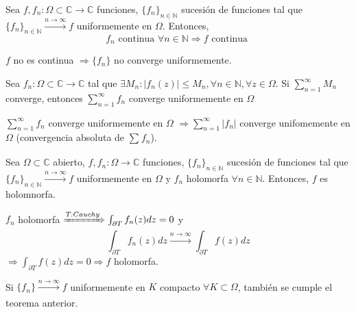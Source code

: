 \begin{prop}
  Sea $f,f_{n}: \Omega \subset \mathbb{C} \to \mathbb{C}$ funciones, $\{ f_{n} \}_{n \in \mathbb{N}}$ sucesión de funciones tal que $\{ f_{n} \}_{n \in \mathbb{N}} \xrightarrow[]{ n \rightarrow \infty } f$ uniformemente en $\Omega$. Entonces,
  \[ 
    f_{n} \text{ continua } \forall n \in \mathbb{N} \Rightarrow f \text{ continua }
  \] 
\end{prop}

\begin{obs}
  $f$ no es continua $\Rightarrow \{ f_{n} \}$ no converge uniformemente.
\end{obs}

\begin{theo}[Weierstrass]
  Sea $f_{n}: \Omega \subset \mathbb{C} \to \mathbb{C}$ tal que $\exists M_{n} : | f_{n}(z) | \leq M_{n}, \forall n \in \mathbb{N}, \forall z \in \Omega$. Si $\sum_{n = 1}^{\infty} M_{n}$ converge, entonces $\sum_{n = 1}^{\infty} f_{n}$ converge uniformemente en $ \Omega$
\end{theo}

\begin{obs}
  $\sum_{n = 1}^{\infty} f_{n}$ converge uniformemente en $ \Omega$ $\Rightarrow \sum_{n = 1}^{\infty} | f_{n} |$ converge unifomemente en $\Omega$ (convergencia absoluta de $\sum_{}^{} f_{n}$).
\end{obs}

\begin{theo}
  Sea $\Omega \subset \mathbb{C}$ abierto, $f,f_{n}: \Omega \to \mathbb{C}$ funciones, $\{ f_{n} \}_{n \in \mathbb{N}}$ sucesión de funciones tal que $\{ f_{n} \}_{n \in \mathbb{N}} \xrightarrow[]{ n \rightarrow \infty } f$ uniformemente en $\Omega$ y $f_{n}$ holomorfa $\forall n \in \mathbb{N}$. Entonces, $f$ es holomnorfa.
\end{theo}

\begin{dem}
  $f_{n}$ holomorfa $\xRightarrow[]{ T. Cauchy } \int_{\partial{T}}^{} f_{n}(z) dz = 0$ y
  \[ 
    \int_{\partial{T}}^{} f_{n}(z) dz \xrightarrow[]{ n \rightarrow \infty } \int_{\partial{T}}^{} f(z) dz 
  \] 
  $\Rightarrow \int_{\partial{T}}^{} f(z) dz = 0 \Rightarrow f$ holomorfa.
\end{dem}

\begin{cor}
  Si $\{ f_{n} \} \xrightarrow[]{ n \rightarrow \infty } f$ uniformemente en $K$ compacto $\forall K \subset \Omega$, también se cumple el teorema anterior.
\end{cor}
